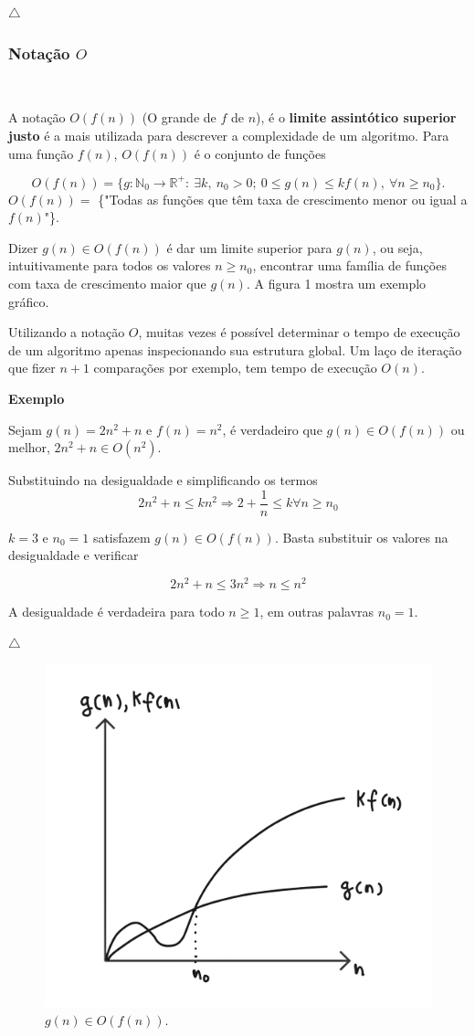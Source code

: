 {\raggedleft $\bigtriangleup$ \par}

\subsubsection{Notação $O$}
\

A notação $O(f(n))$ (O grande de $f$ de $n$), é o \textbf{limite assintótico superior justo} é a mais utilizada para descrever a complexidade de um algoritmo. Para uma função $f(n)$, $O(f(n))$ é o conjunto de funções

\[O(f(n)) = \{g: \mathbb{N}_0 \rightarrow \mathbb{R}^{+}: \ \exists k, \ n_0 > 0 ; \ 0\leq g(n) \leq kf(n), \ \forall n \geq n_0\}.\]
$O(f(n))=$ \{"Todas as funções que têm taxa de crescimento menor ou igual a $f(n)$"\}.

Dizer $g(n) \in O(f(n))$ é dar um limite superior para $g(n)$, ou seja, intuitivamente para todos os valores $n\geq n_0$, encontrar uma família de funções com taxa de crescimento maior que $g(n)$. A figura 1 mostra um exemplo gráfico.

Utilizando a notação $O$, muitas vezes é possível determinar o tempo de execução de um algoritmo apenas inspecionando sua estrutura global. Um laço de iteração que fizer $n + 1$ comparações por exemplo, tem tempo de execução $O(n)$.

\textbf{Exemplo}

Sejam $g(n)=2n^2 + n$ e $f(n)=n^2$, é verdadeiro que $g(n)\in O(f(n))$ ou melhor, $2n^2 + n \in O(n^2)$.

Substituindo na desigualdade e simplificando os termos
\[2n^2+n\leq kn^2 \Rightarrow 2 + \frac{1}{n}\leq k \forall n\geq n_0\]

$k=3$ e $n_0=1$ satisfazem $g(n)\in O(f(n))$. Basta substituir os valores na desigualdade e verificar

\[2n^2+n\leq 3n^2 \Rightarrow n\leq n^2\]

A desigualdade é verdadeira para todo $n\geq 1$, em outras palavras $n_0=1$.

{\raggedleft $\bigtriangleup$ \par}

\begin{figure}
  \centering
  \includegraphics[width=0.4\linewidth]{img/O(f(n)).png}
    \caption{$g(n)\in O(f(n))$.}
    \label{O(f(n))}
\end{figure}

